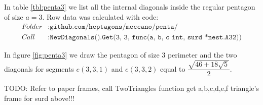 \documentclass[11pt]{article}
\begin{document}
In table \ref{tbl:penta3} we list all the internal diagonals inside the regular
pentagon of size $a=3$. Row data was calculated with code:
\begin{align*}
Folder &: \texttt{github.com/heptagons/meccano/penta/}\\
Call &: \texttt{NewDiagonals().Get(3, 3, func(a, b, c int, surd *nest.A32))}
\end{align*}

In figure \ref{fig:penta3} we draw the pentagon of size 3 perimeter and the two
diagonals for segments $e(3,3,1)$ and $e(3,3,2)$ equal to $\dfrac{\sqrt{46+18\sqrt5}}2$.

TODO:
Refer to paper frames, call TwoTriangles function get a,b,c,d,e,f triangle's frame for surd above!!!
\end{document}
